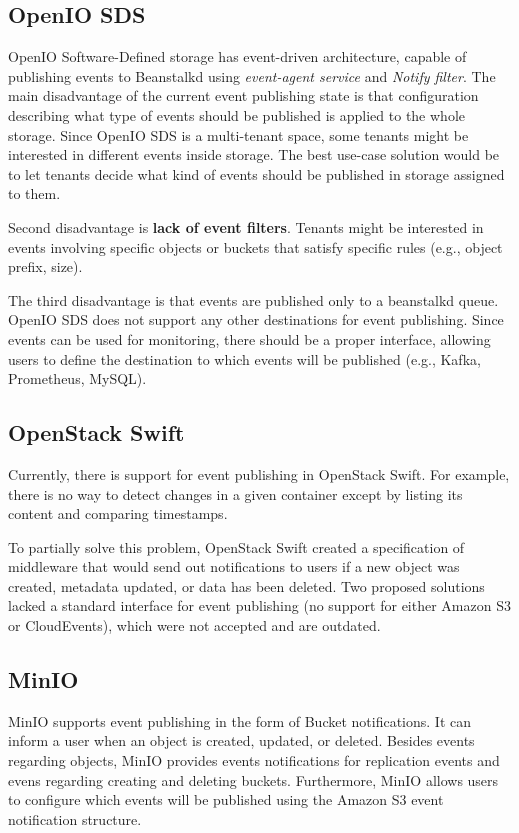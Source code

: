     \subsection{OpenIO SDS}
    OpenIO Software-Defined storage has event-driven architecture, capable of publishing events to Beanstalkd using \textit{event-agent service} and \textit{Notify filter}.
    The main disadvantage of the current event publishing state is that configuration describing what type of events should be published is applied to the whole storage. Since OpenIO SDS is a multi-tenant space, some tenants might be interested in different events inside storage. The best use-case solution would be to let tenants decide what kind of events should be published in storage assigned to them.

    Second disadvantage is \textbf{lack of event filters}. Tenants might be interested in events involving specific objects or buckets that satisfy specific rules (e.g., object prefix, size).

    The third disadvantage is that events are published only to a beanstalkd queue. OpenIO SDS does not support any other destinations for event publishing. Since events can be used for monitoring, there should be a proper interface, allowing users to define the destination to which events will be published (e.g., Kafka, Prometheus, MySQL).

    \subsection{OpenStack Swift}
    Currently, there is support for event publishing in OpenStack Swift. For example, there is no way to detect changes in a given container except by listing its content and comparing timestamps.

    To partially solve this problem, OpenStack Swift created a specification of middleware that would send out notifications to users if a new object was created, metadata updated, or data has been deleted.
    Two proposed solutions lacked a standard interface for event publishing (no support for either Amazon S3 or CloudEvents), which were not accepted and are outdated.

    \subsection{MinIO}
    MinIO supports event publishing in the form of Bucket notifications. It can inform a user when an object is created, updated, or deleted. Besides events regarding objects, MinIO provides events notifications for replication events and evens regarding creating and deleting buckets. Furthermore, MinIO allows users to configure which events will be published using the Amazon S3 event notification structure.


